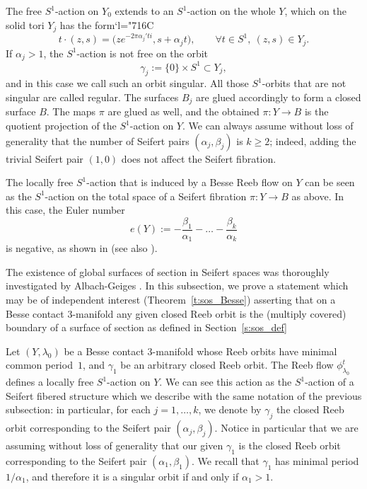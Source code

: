 \documentclass[JEP,XML,SOM,Unicode,published]{cedram}
\newcommand{\Changelback}{\mathcode`l="716C}
\theoremstyle{definition}
\let\eul e
\begin{document}
The free $S^1$-action on $Y_0$ extends to an $S^1$-action on the whole $Y$, which on the solid tori $Y_j$ has the form\Changelback
\[
t\cdot(z,s)=\big(z e^{-2\pi\alpha_j't i},s+\alpha_j t\big),
\qquad
\forall t\in S^1,\ (z,s)\in Y_j.
\]
If $\alpha_j>1$, the $S^1$-action is not free on the orbit
\[
\gamma_j:=\{0\}\times S^1\subset Y_j,
\]
and in this case we call such an orbit singular. All those $S^1$-orbits that are not singular are called regular.
The surfaces $B_j$ are glued accordingly to form a closed surface $B$. The maps $\pi$ are glued as well, and the obtained $\pi:Y\to B$ is the quotient projection of the $S^1$-action on $Y$.
We can always assume without loss of generality that the number of Seifert pairs $(\alpha_j,\beta_j)$ is $k\geq2$; indeed, adding the trivial Seifert pair $(1,0)$ does not affect the Seifert fibration.

The locally free $S^1$-action that is induced by a Besse Reeb flow on $Y$ can be seen as the $S^1$-action on the total space of a Seifert fibration $\pi:Y\to B$ as above. In this case, the Euler number
\[
\eul(Y):=-\frac{\beta_1}{\alpha_1}-\dots-\frac{\beta_k}{\alpha_k}
\]
is negative, as shown in \cite{Lisca:2004oz} (see also \cite[Th.\,1.4]{Kegel:2021vo}).

\label{s:sos_Besse}
The existence of global surfaces of section in Seifert spaces was thoroughly investigated by Albach-Geiges \cite{Albach:2021wi}. In this subsection, we prove a statement which may be of independent interest (Theorem~\ref{t:sos_Besse}) asserting that on a Besse contact $3$-manifold any given closed Reeb orbit is the (multiply covered) boundary of a surface of section as defined in Section~\ref{s:sos_def}

Let $(Y,\lambda_0)$ be a Besse contact $3$-manifold whose Reeb orbits have minimal common period~$1$, and $\gamma_1$ be an arbitrary closed Reeb orbit. The Reeb flow $\phi_{\lambda_0}^t$ defines a locally free $S^1$-action on $Y$. We can see this action as the $S^1$-action of a Seifert fibered structure which we describe with the same notation of the previous subsection: in particular, for each $j=1,\dots,k$, we denote by $\gamma_j$ the closed Reeb orbit corresponding to the Seifert pair $(\alpha_j,\beta_j)$. Notice in particular that we are assuming without loss of generality that our given $\gamma_1$ is the closed Reeb orbit corresponding to the Seifert pair $(\alpha_1,\beta_1)$. We recall that $\gamma_1$ has minimal period $1/\alpha_1$, and therefore it is a singular orbit if and only if $\alpha_1>1$.
\end{document}
